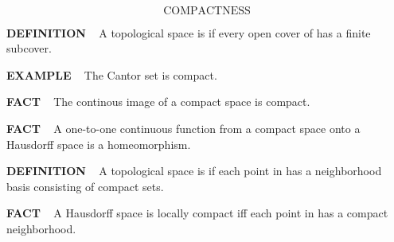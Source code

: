 \vspace{0.1cm}



\newpage
\setcounter{theoremn}{0}


\ \indent 

\[
\text{COMPACTNESS}
\]

\begin{x}{\small\bf DEFINITION} \ %
A topological space \mX is 
if every open cover of \mX has a finite subcover.
\end{x}

\vspace{0.1cm}


\begin{x}{\small\bf EXAMPLE} \ %
The Cantor set is compact.
\end{x}

\vspace{0.1cm}

\begin{x}{\small\bf FACT} \ %
The continous image of a compact space is compact.
\end{x}

\vspace{0.1cm}

\begin{x}{\small\bf FACT} \ %
A one-to-one continuous function from a compact space \mX onto a Hausdorff space \mY is a homeomorphism.
\end{x}

\vspace{0.1cm}

\begin{x}{\small\bf DEFINITION} \ %
A topological space \mX is 
if each point in \mX has a neighborhood basis consisting of compact sets.
\end{x}

\vspace{0.1cm}

\begin{x}{\small\bf FACT} \ %
A Hausdorff space \mX is locally compact iff each point in \mX has a compact neighborhood.
\end{x}

\vspace{0.1cm}

